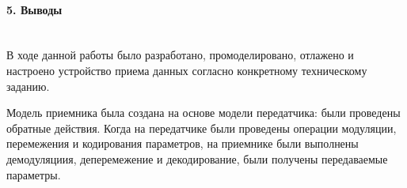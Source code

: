 \documentclass[12pt,a4paper]{report}
\begin{document}
\paragraph{5. Выводы \\\\}
В ходе данной работы было разработано, промоделировано, отлажено и настроено устройство приема данных согласно конкретному техническому заданию. 

Модель приемника была создана на основе модели передатчика: были проведены обратные действия. Когда на передатчике были проведены операции модуляции, перемежения и кодирования параметров, на приемнике были выполнены демодуляциия, деперемежение и декодирование, были получены передаваемые параметры.
\end{document}
